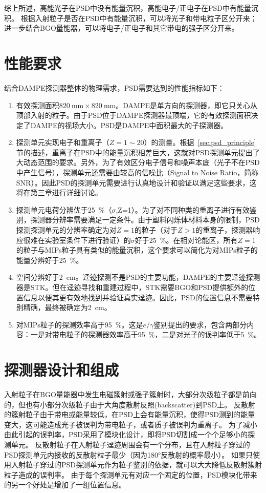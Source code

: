 综上所述，高能光子在PSD中没有能量沉积，高能电子/正电子在PSD中有能量沉积。
根据入射粒子是否在PSD中有能量沉积，可以将光子和带电粒子区分开来；进一步结合BGO量能器，可以将电子/正电子和其它带电的强子区分开来。

\section{性能要求}
\label{sec:psd_requirements}
结合DAMPE探测器整体的物理需求，PSD需要达到的性能指标如下：
\begin{enumerate}
	\item 有效探测面积$\SI{820}{\milli\meter}\times\SI{820}{\milli\meter}$。DAMPE是单方向的探测器，即它只关心从顶部入射的粒子。由于PSD位于DAMPE探测器最顶端，它的有效探测面积决定了DAMPE的视场大小。PSD是DAMPE中面积最大的子探测器。
	\item 探测单元实现电子和重离子（$Z=1\sim20$）的测量。根据~\ref{sec:psd_principle}节的描述，重离子在PSD中的能量沉积相差巨大，这就对PSD探测单元提出了大动态范围的要求。另外，为了有效区分电子信号和噪声本底（光子不在PSD中产生信号），探测单元还需要由较高的信噪比（Signal to Noise Ratio，简称SNR）。因此PSD的探测单元需要进行认真地设计和验证以满足这些要求，这将在第三章进行详细讨论。
	\item 探测单元电荷分辨优于\SI{25}{\percent}（$\sigma$,Z=1）。为了对不同种类的重离子进行有效鉴别，探测器分辨率需要满足一定条件。由于塑料闪烁体材料本身的限制，PSD探测探测单元的分辨率确定为对$Z=1$的粒子（对于$Z>1$的重离子，探测器响应很难在实验室条件下进行验证）的$\sigma$好于\SI{25}{\percent}。在相对论能区，所有$Z=1$的粒子与MIPs粒子具有类似的能量沉积，这个要求可以简化为对MIPs粒子的能量分辨好于\SI{25}{\percent}。
	\item 空间分辨好于\SI{2}{\centi\meter}。迳迹探测不是PSD的主要功能，DAMPE的主要迳迹探测器是STK。但在迳迹寻找和重建过程中，STK需要BGO和PSD提供额外的位置信息以便其更有效地找到并验证真实迳迹。因此，PSD的位置信息不需要特别精确，最终被确定为\SI{2}{\centi\meter}。
	\item 对MIPs粒子的探测效率高于\SI{95}{\percent}。这是$e/\gamma$鉴别提出的要求，包含两部分内容：一是对带电粒子的探测器效率高于\SI{95}{\percent}，二是对光子的误判率低于\SI{5}{\percent}。
\end{enumerate}

\section{探测器设计和组成}
\label{sec:psd_composition}
入射粒子在BGO量能器中发生电磁簇射或强子簇射时，大部分次级粒子都是前向的，但也有小部分次级粒子由于大角度散射反照(backscatter)到PSD上。
反散射的簇射粒子由于带电或能量较低，在PSD上会有能量沉积，使得PSD测到的能量变大，这可能造成光子被误判为带电粒子，或者质子被误判为重离子。
为了减小由此引起的误判率，PSD采用了模块化设计，即将PSD切割成一个个足够小的探测单元。
反散射粒子在入射粒子迳迹周围会有一个分布，且在入射粒子穿过的PSD探测单元内接收的反散射粒子最少（因为\ang{180}反散射的概率最小）。
如果只使用入射粒子穿过的PSD探测单元作为粒子鉴别的依据，就可以大大降低反散射簇射粒子造成的误判率。
由于每个探测单元有对应一个固定的位置，PSD模块化带来的另一个好处是增加了一组位置信息。

